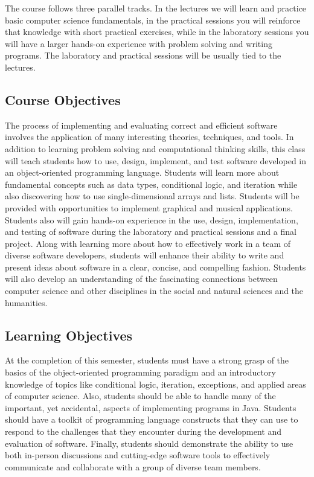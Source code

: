 \noindent The course follows three parallel tracks. In the lectures we will learn and practice basic computer science fundamentals, in the practical sessions you will reinforce that knowledge with short practical exercises, while in the laboratory sessions you will have a larger hands-on experience with problem solving and writing programs. The laboratory and practical sessions will be usually tied to the lectures.

\subsection*{Course Objectives}

The process of implementing and evaluating correct and efficient software involves the application of many interesting
theories, techniques, and tools.  In addition to learning problem solving and computational thinking skills, this class
will teach students how to use, design, implement, and test software developed in an object-oriented programming language.
Students will learn more about fundamental concepts such as data types, conditional logic, and iteration while also
discovering how to use single-dimensional arrays and lists. Students will be provided with opportunities to implement graphical and musical
applications.  Students also will gain hands-on experience in the use, design, implementation, and testing of software
during the laboratory and practical sessions and a final project.  Along with learning more about how to effectively
work in a team of diverse software developers, students will enhance their ability to write and present ideas about software in
a clear, concise, and compelling fashion.  Students will also develop an understanding of the fascinating connections
between computer science and other disciplines in the social and natural sciences and the humanities.

\subsection*{Learning Objectives}

At the completion of this semester, students must have a strong grasp of the basics of the object-oriented programming
paradigm and an introductory knowledge of topics like conditional logic, iteration, exceptions, and
applied areas of computer science.  Also, students should be able to handle many of the important, yet accidental, aspects of
implementing programs in Java.  
Students should have a toolkit of programming language constructs that they can use to respond to the challenges that
they encounter during the development and evaluation of software. Finally, students should demonstrate the ability to
use both in-person discussions and cutting-edge software tools to effectively communicate and collaborate with a group
of diverse team members.

